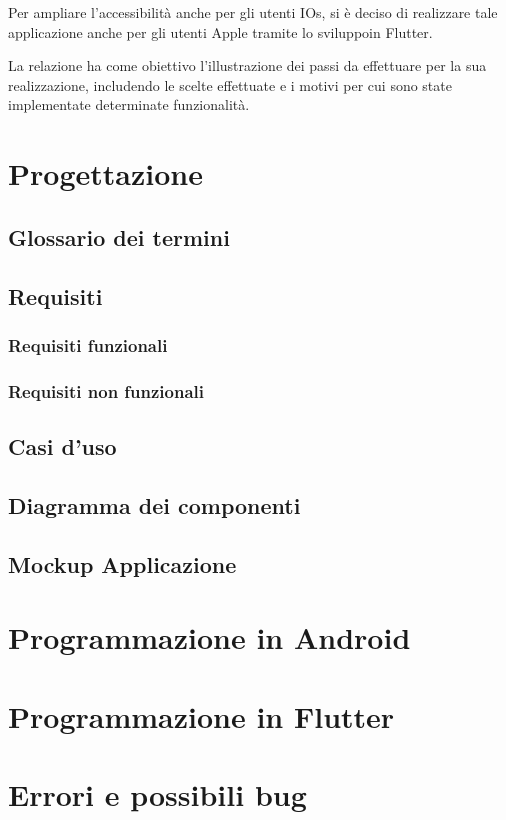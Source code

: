 \documentclass{article}
\begin{document}
Per ampliare l'accessibilità anche per gli utenti IOs, si è deciso di realizzare tale applicazione anche per gli utenti Apple tramite lo sviluppoin Flutter.

La relazione ha come obiettivo l'illustrazione dei passi da effettuare per la sua realizzazione, includendo le scelte effettuate e i motivi per cui sono state implementate determinate funzionalità.

\section{Progettazione}

\subsection{Glossario dei termini}
\subsection{Requisiti}
\subsubsection{Requisiti funzionali}
\subsubsection{Requisiti non funzionali}

\subsection{Casi d'uso}

\subsection{Diagramma dei componenti}

\subsection{Mockup Applicazione}


\section{Programmazione in Android}

\section{Programmazione in Flutter}

\section{Errori e possibili bug}
\end{document}
